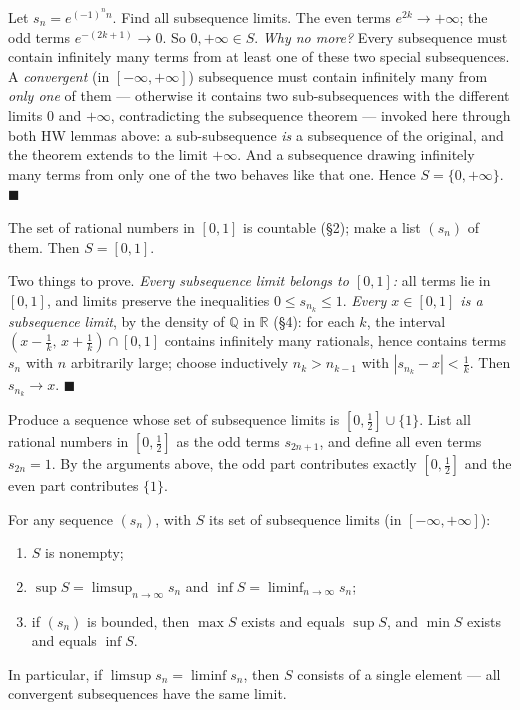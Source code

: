\documentclass[11pt]{report}
\begin{document}
\begin{exbox}
Let $s_n = e^{(-1)^n n}$. Find all subsequence limits. The even terms $e^{2k} \to +\infty$; the odd terms $e^{-(2k+1)} \to 0$. So $0, +\infty \in S$. \emph{Why no more?} Every subsequence must contain infinitely many terms from at least one of these two special subsequences. A \emph{convergent} (in $[-\infty,+\infty]$) subsequence must contain infinitely many from \emph{only one} of them --- otherwise it contains two sub-subsequences with the different limits $0$ and $+\infty$, contradicting the subsequence theorem --- invoked here through both HW lemmas above: a sub-subsequence \emph{is} a subsequence of the original, and the theorem extends to the limit $+\infty$. And a subsequence drawing infinitely many terms from only one of the two behaves like that one. Hence $S = \{0, +\infty\}$. \hfill $\blacksquare$
\end{exbox}

\begin{exbox}
The set of rational numbers in $[0,1]$ is countable (\S 2); make a list $(s_n)$ of them. Then $S = [0,1]$.

Two things to prove. \emph{Every subsequence limit belongs to $[0,1]$:} all terms lie in $[0,1]$, and limits preserve the inequalities $0 \leq s_{n_k} \leq 1$. \emph{Every $x \in [0,1]$ is a subsequence limit}, by the density of $\mathbb{Q}$ in $\mathbb{R}$ (\S 4): for each $k$, the interval $(x - \tfrac1k,\, x + \tfrac1k) \cap [0,1]$ contains infinitely many rationals, hence contains terms $s_n$ with $n$ arbitrarily large; choose inductively $n_k > n_{k-1}$ with $|s_{n_k} - x| < \tfrac1k$. Then $s_{n_k} \to x$. \hfill $\blacksquare$
\end{exbox}

\begin{exbox}
Produce a sequence whose set of subsequence limits is $[0, \tfrac12] \cup \{1\}$. List all rational numbers in $[0, \tfrac12]$ as the odd terms $s_{2n+1}$, and define all even terms $s_{2n} = 1$. By the arguments above, the odd part contributes exactly $[0, \tfrac12]$ and the even part contributes $\{1\}$.
\end{exbox}

\begin{thmbox}
For any sequence $(s_n)$, with $S$ its set of subsequence limits (in $[-\infty, +\infty]$):
\begin{enumerate}[label=(\arabic*)]
    \item $S$ is nonempty;
    \item $\sup S = \limsup_{n\to\infty} s_n$ and $\inf S = \liminf_{n\to\infty} s_n$;
    \item if $(s_n)$ is bounded, then $\max S$ exists and equals $\sup S$, and $\min S$ exists and equals $\inf S$.
\end{enumerate}
In particular, if $\limsup s_n = \liminf s_n$, then $S$ consists of a single element --- all convergent subsequences have the same limit.
\end{thmbox}
\end{document}

